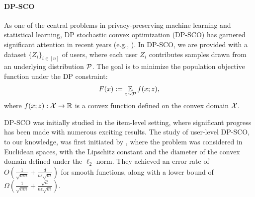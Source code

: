 \paragraph{DP-SCO}
As one of the central problems in privacy-preserving machine learning and statistical learning, DP stochastic convex optimization (DP-SCO) has garnered significant attention in recent years (e.g., \cite{bst14,bftt19,FKT20,bfgt20,bgm21,shw22,gopi2022private,alt24}). 
In DP-SCO, we are provided with a dataset $\{Z_i\}_{i \in [n]}$ of users, where each user $Z_i$ contributes samples drawn from an underlying distribution $\mathcal{P}$. 
The goal is to minimize the population objective function under the DP constraint: 
\begin{align*} 
F(x) := \operatorname*{\mathbb{E}}_{z \sim \mathcal{P}} f(x; z), 
\end{align*} 
where $f(x; z): \mathcal{X} \to \mathbb{R}$ is a convex function defined on the convex domain $\mathcal{X}$.


DP-SCO was initially studied in the item-level setting, where significant progress has been made with numerous exciting results. 
The study of user-level DP-SCO, to our knowledge, was first initiated by \cite{levy2021learning}, where the problem was considered in Euclidean spaces, with the Lipschitz constant and the diameter of the convex domain defined under the $\ell_2$-norm.
They achieved an error rate of $O\left(\frac{1}{\sqrt{mn}} + \frac{d}{n \epsilon \sqrt{m}}\right)$ for smooth functions, along with a lower bound of $\Omega\left(\frac{1}{\sqrt{mn}} + \frac{\sqrt{d}}{n \epsilon \sqrt{m}}\right)$. 

